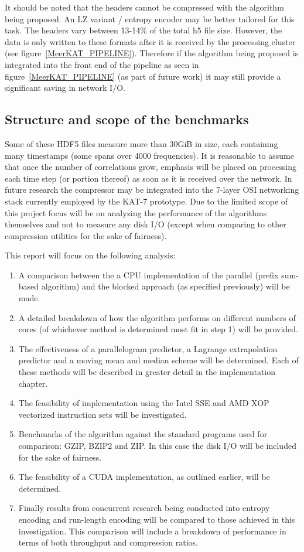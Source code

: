 It should be noted that the headers cannot be compressed with the algorithm being proposed. An LZ variant / entropy encoder may be better tailored for this task. 
The headers vary between 13-14\% of the total h5 file size. However, the data is only written to these formats after it is received by the processing cluster (see 
figure~\ref{MeerKAT_PIPELINE}). Therefore if the algorithm being proposed is integrated into the front end of the pipeline as seen in figure~\ref{MeerKAT_PIPELINE} (as part of 
future work) it may still provide a significant saving in network I/O. 
\subsection{Structure and scope of the benchmarks}
Some of these HDF5 files measure more than 30GiB in size, each containing many timestamps (some spans over 4000 frequencies). It is reasonable to assume that once the number of correlations grow, emphasis will be placed on processing each 
time step (or portion thereof) as soon as it is received over the network. In future research the compressor may be integrated into the 7-layer OSI networking stack currently employed by the KAT-7 prototype. Due to the limited
scope of this project focus will be on analyzing the performance of the algorithms themselves and not to measure any disk I/O (except when comparing to other compression utilities for the sake of fairness).

This report will focus on the following analysis:
\begin{enumerate}
 \item A comparison between the a CPU implementation of the parallel (prefix sum-based algorithm) and the blocked approach (as specified previously) will be made.
 \item A detailed breakdown of how the algorithm performs on different numbers of cores (of whichever method is determined most fit in step 1) will be provided.
 \item The effectiveness of a parallelogram predictor, a Lagrange extrapolation predictor \cite{engelson2000lossless} and a moving mean and median scheme will be determined. 
       Each of these methods will be described in greater detail in the implementation chapter.
 \item The feasibility of implementation using the Intel SSE and AMD XOP vectorized instruction sets will be investigated.
 \item Benchmarks of the algorithm against the standard programs used for comparison: GZIP, BZIP2 and ZIP. In this case the disk I/O will be included for the sake of fairness.
 \item The feasibility of a CUDA implementation, as outlined earlier, will be determined.
 \item Finally results from concurrent research being conducted into entropy encoding and run-length encoding will be compared to those achieved in this investigation. This comparison will include a 
       breakdown of performance in terms of both throughput and compression ratios.
\end{enumerate}
